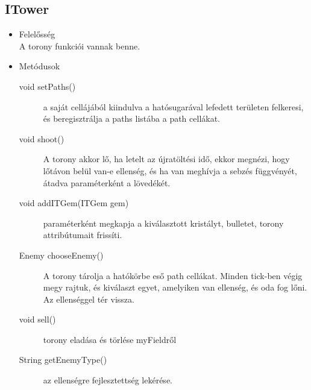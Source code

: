 \subsection{ITower}
\begin{itemize}
\item Felelősség\\
A torony funkciói vannak benne.
\item Metódusok\\
	\begin{description}
		\item[void setPaths()] a saját cellájából kiindulva a hatósugarával lefedett területen felkeresi, és beregisztrálja a paths listába a path cellákat.
\item[void shoot()] A torony akkor lő, ha letelt az újratöltési idő, ekkor megnézi, hogy lőtávon belül van-e ellenség, és ha van meghívja a sebzés függvényét, átadva paraméterként a lövedékét. 
\item[void addITGem(ITGem gem)] paraméterként megkapja a kiválasztott kristályt, bulletet, torony attribútumait frissíti.
\item[Enemy chooseEnemy()] A torony tárolja a hatókörbe eső path cellákat. Minden tick-ben végig megy rajtuk, és kiválaszt egyet, amelyiken van ellenség, és oda fog lőni. Az ellenséggel tér vissza.
\item[void sell()] torony eladása és törlése myFieldről
\item[String getEnemyType()] az ellenségre fejlesztettség lekérése.

		
		
	\end{description}
\end{itemize}
